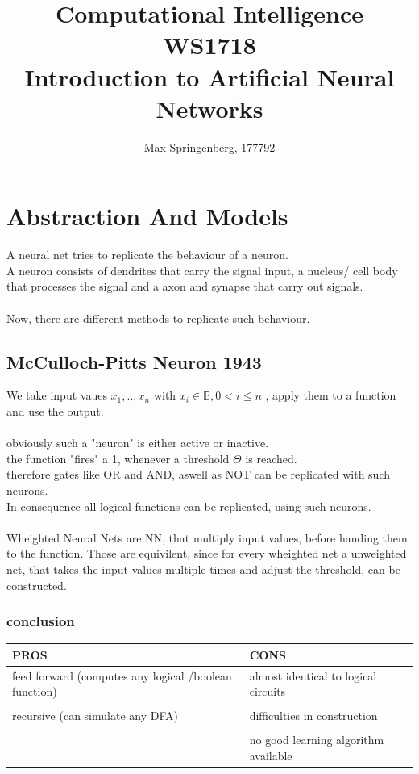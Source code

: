 \documentclass{article}
\author{Max Springenberg, 177792}
\title{
    Computational Intelligence WS1718\\
    Introduction to Artificial Neural Networks
}
\date{}
\begin{document}
\maketitle

\section{Abstraction And Models}
A neural net tries to replicate the behaviour of a neuron.\\
A neuron consists of dendrites that carry the signal input, a nucleus/ cell body that processes the signal and a axon and 
synapse that carry out signals.\\
\\
Now, there are different methods to replicate such behaviour.\\
\subsection{McCulloch-Pitts Neuron 1943}
We take input vaues 
$x_1, .., x_n$ with $x_i \in \mathbb{B}, 0 < i \leq n$ 
, apply them to a function and use the output.\\
\\
obviously such a "neuron" is either active or inactive.\\
the function "fires" a 1, whenever a threshold $\Theta$ is reached.\\
therefore gates like OR and AND, aswell as NOT can be replicated with such neurons.\\
In consequence all logical functions can be replicated, using such neurons.\\
\\
Wheighted Neural Nets are NN, that multiply input values, before handing them to the function. Those are equivilent, since
for every wheighted net a unweighted net, that takes the input values multiple times and adjust the threshold, can be
constructed.\\
\subsubsection{conclusion}
\begin{tabular}{l|l}
    PROS&CONS\\
    \hline
    feed forward (computes any logical /boolean  function)  & almost identical to logical circuits\\
    \\
    recursive (can simulate any DFA)                        & difficulties in construction\\
    \\
                                                            & no good learning algorithm available\\
\end{tabular}
\end{document}

